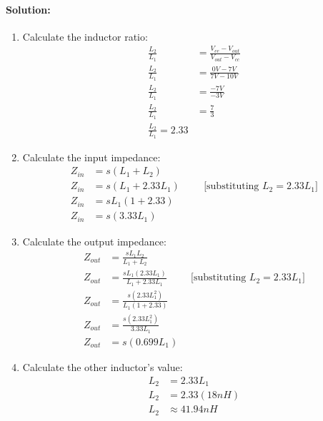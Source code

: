 \paragraph{Solution:}
\begin{enumerate}
  \item Calculate the inductor ratio:
    \begin{align*}
      \frac{L_2}{L_1} &= \frac{V_{ee} - V_{out}}{V_{out} - V_{cc}} \\
      \frac{L_2}{L_1} &= \frac{0V - 7V}{7V - 10V} \\
      \frac{L_2}{L_1} &= \frac{-7V}{-3V} \\
      \frac{L_2}{L_1} &= \frac{7}{3} \\
      \frac{L_2}{L_1} = 2.33
    \end{align*}
  \item Calculate the input impedance:
    \begin{align*}
      Z_{in} &= s(L_1 + L_2) \\
      Z_{in} &= s(L_1 + 2.33L_1) \hspace{1cm} \text{[substituting \(L_2 = 2.33L_1\)]} \\
      Z_{in} &= sL_1(1 + 2.33) \\
      Z_{in} &= s(3.33L_1)
    \end{align*}
  \item Calculate the output impedance:
    \begin{align*}
      Z_{out} &= \frac{sL_1 L_2}{L_1+L_2} \\
      Z_{out} &= \frac{sL_1(2.33L_1)}{L_1 + 2.33L_1} \hspace{1cm} \text{[substituting \(L_2 = 2.33L_1\)]} \\
      Z_{out} &= \frac{s(2.33L_1^2)}{L_1(1+2.33)} \\
      Z_{out} &= \frac{s(2.33L_1^2)}{3.33L_1} \\
      Z_{out} &= s(0.699L_1)
    \end{align*}
  \item Calculate the other inductor's value:
    \begin{align*}
      L_2 &= 2.33L_1 \\
      L_2 &= 2.33(18nH) \\
      L_2 &\approx 41.94nH
    \end{align*}
\end{enumerate}

